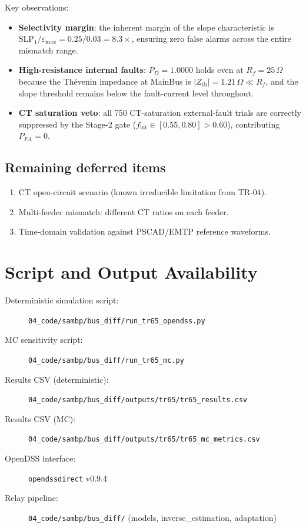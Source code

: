 \documentclass[12pt,a4paper]{article}
\begin{document}
\noindent Key observations:
\begin{itemize}
  \item \textbf{Selectivity margin}: the inherent margin of the slope
    characteristic is $\mathrm{SLP}_1 / \varepsilon_\mathrm{max}
    = 0.25 / 0.03 = 8.3\times$, ensuring zero false alarms across the
    entire mismatch range.
  \item \textbf{High-resistance internal faults}: $P_D = 1.0000$ holds even
    at $R_f = 25\,\Omega$ because the Thévenin impedance at MainBus is
    $|Z_\mathrm{th}| = 1.21\,\Omega \ll R_f$, and the slope threshold remains
    below the fault-current level throughout.
  \item \textbf{CT saturation veto}: all 750 CT-saturation external-fault
    trials are correctly suppressed by the Stage-2 gate ($f_\mathrm{int}
    \in [0.55, 0.80] > 0.60$), contributing $P_{FA} = 0$.
\end{itemize}

\subsection*{Remaining deferred items}

\begin{enumerate}
  \item CT open-circuit scenario (known irreducible limitation from TR-04).
  \item Multi-feeder mismatch: different CT ratios on each feeder.
  \item Time-domain validation against PSCAD/EMTP reference waveforms.
\end{enumerate}

\appendix
\section{Script and Output Availability}
\label{app:code}

\begin{description}
  \item[Deterministic simulation script:]
    \texttt{04\_code/sambp/bus\_diff/run\_tr65\_opendss.py}
  \item[MC sensitivity script:]
    \texttt{04\_code/sambp/bus\_diff/run\_tr65\_mc.py}
  \item[Results CSV (deterministic):]
    \texttt{04\_code/sambp/bus\_diff/outputs/tr65/tr65\_results.csv}
  \item[Results CSV (MC):]
    \texttt{04\_code/sambp/bus\_diff/outputs/tr65/tr65\_mc\_metrics.csv}
  \item[OpenDSS interface:]
    \texttt{opendssdirect} v0.9.4~\citep{opendssdirect}
  \item[Relay pipeline:]
    \texttt{04\_code/sambp/bus\_diff/} (models, inverse\_estimation, adaptation)
\end{description}


\end{document}
